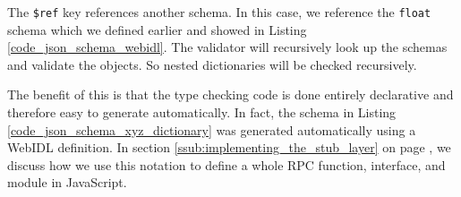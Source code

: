 The \lstinline{$ref} key references another schema. In this case, we reference the \lstinline{float} schema which we defined earlier and showed in Listing \ref{code_json_schema_webidl}. The validator will recursively look up the schemas and validate the objects. So nested dictionaries will be checked recursively. 

The benefit of this is that the type checking code is done entirely declarative and therefore easy to generate automatically. In fact, the schema in Listing \ref{code_json_schema_xyz_dictionary} was generated automatically using a WebIDL definition. In section \ref{ssub:implementing_the_stub_layer} on page \pageref{ssub:implementing_the_stub_layer}, we discuss how we use this notation to define a whole RPC function, interface, and module in JavaScript.



